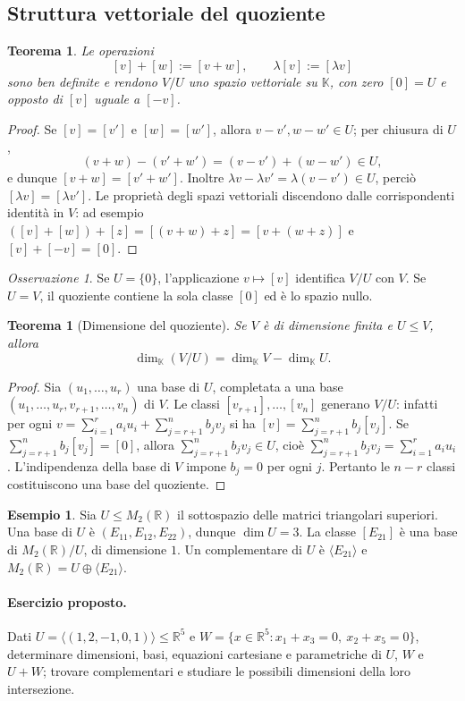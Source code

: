 \documentclass[11pt,a4paper]{article}
\newcommand{\RR}{\mathbb{R}}
\newcommand{\KK}{\mathbb{K}}
\theoremstyle{plain}
\newtheorem{teo}[prop]{Teorema}
\theoremstyle{definition}
\newtheorem{esempio}[prop]{Esempio}
\theoremstyle{remark}
\newtheorem{oss}[prop]{Osservazione}
\begin{document}
\subsection{Struttura vettoriale del quoziente}
\begin{teo}
Le operazioni
\[
[v]+[w]:=[v+w],\qquad \lambda[v]:=[\lambda v]
\]
sono ben definite e rendono $V/U$ uno spazio vettoriale su $\KK$, con zero $[0]=U$ e opposto di $[v]$ uguale a $[-v]$.
\end{teo}
\begin{proof}
Se $[v]=[v']$ e $[w]=[w']$, allora $v-v',w-w'\in U$; per chiusura di $U$,
\[(v+w)-(v'+w')=(v-v')+(w-w')\in U,\]
e dunque $[v+w]=[v'+w']$. Inoltre $\lambda v-\lambda v'=\lambda(v-v')\in U$, perciò $[\lambda v]=[\lambda v']$. Le proprietà degli spazi vettoriali discendono dalle corrispondenti identità in $V$: ad esempio $([v]+[w])+[z]=[(v+w)+z]=[v+(w+z)]$ e $[v]+[-v]=[0]$.
\end{proof}
\begin{oss}
Se $U=\{0\}$, l'applicazione $v\mapsto[v]$ identifica $V/U$ con $V$. Se $U=V$, il quoziente contiene la sola classe $[0]$ ed è lo spazio nullo.
\end{oss}
\begin{teo}[Dimensione del quoziente]
Se $V$ è di dimensione finita e $U\leq V$, allora
\[\dim_{\KK}(V/U)=\dim_{\KK}V-\dim_{\KK}U.\]
\end{teo}
\begin{proof}
Sia $(u_1,\ldots,u_r)$ una base di $U$, completata a una base $(u_1,\ldots,u_r,v_{r+1},\ldots,v_n)$ di $V$. Le classi $[v_{r+1}],\ldots,[v_n]$ generano $V/U$: infatti per ogni $v=\sum_{i=1}^r a_i u_i+\sum_{j=r+1}^n b_jv_j$ si ha $[v]=\sum_{j=r+1}^n b_j[v_j]$. Se $\sum_{j=r+1}^n b_j[v_j]=[0]$, allora $\sum_{j=r+1}^n b_jv_j\in U$, cioè $\sum_{j=r+1}^n b_jv_j=\sum_{i=1}^r a_i u_i$. L'indipendenza della base di $V$ impone $b_j=0$ per ogni $j$. Pertanto le $n-r$ classi costituiscono una base del quoziente.
\end{proof}
\begin{esempio}
Sia $U\leq M_2(\RR)$ il sottospazio delle matrici triangolari superiori. Una base di $U$ è $(E_{11},E_{12},E_{22})$, dunque $\dim U=3$. La classe $[E_{21}]$ è una base di $M_2(\RR)/U$, di dimensione $1$. Un complementare di $U$ è $\langle E_{21}\rangle$ e $M_2(\RR)=U\oplus\langle E_{21}\rangle$.
\end{esempio}
\paragraph{Esercizio proposto.} Dati $U=\langle(1,2,-1,0,1)\rangle\leq\RR^5$ e $W=\{x\in\RR^5:x_1+x_3=0,\ x_2+x_5=0\}$, determinare dimensioni, basi, equazioni cartesiane e parametriche di $U$, $W$ e $U+W$; trovare complementari e studiare le possibili dimensioni della loro intersezione.
\end{document}
